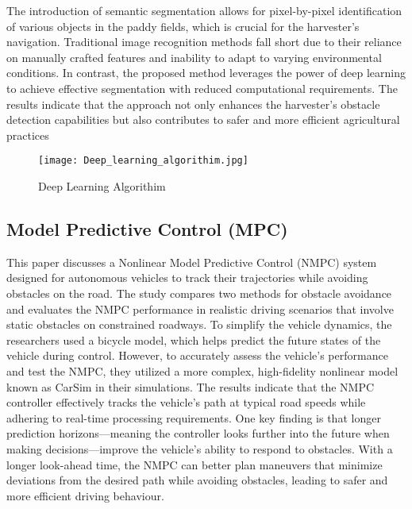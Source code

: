 \documentclass[12pt,twocolumn]{article}
\begin{document}
The introduction of semantic segmentation allows for pixel-by-pixel identification of various objects in the paddy fields, which is crucial for the harvester's navigation. Traditional image recognition methods fall short due to their reliance on manually crafted features and inability to adapt to varying environmental conditions. In contrast, the proposed method leverages the power of deep learning to achieve effective segmentation with reduced computational requirements. The results indicate that the approach not only enhances the harvester's obstacle detection capabilities but also contributes to safer and more efficient agricultural practices

\begin{figure}[h]
\centering
\texttt{[image: Deep\_learning\_algorithim.jpg]}
\caption{Deep Learning Algorithim}
\label{fig_ICNet}
\end{figure}
\subsection{Model Predictive Control (MPC)}

This paper discusses a Nonlinear Model Predictive Control (NMPC) system designed for autonomous vehicles to track their trajectories while avoiding obstacles on the road. The study compares two methods for obstacle avoidance and evaluates the NMPC performance in realistic driving scenarios that involve static obstacles on constrained roadways. To simplify the vehicle dynamics, the researchers used a bicycle model, which helps predict the future states of the vehicle during control. However, to accurately assess the vehicle's performance and test the NMPC, they utilized a more complex, high-fidelity nonlinear model known as CarSim in their simulations.
The results indicate that the NMPC controller effectively tracks the vehicle's path at typical road speeds while adhering to real-time processing requirements. One key finding is that longer prediction horizons—meaning the controller looks further into the future when making decisions—improve the vehicle's ability to respond to obstacles. With a longer look-ahead time, the NMPC can better plan maneuvers that minimize deviations from the desired path while avoiding obstacles, leading to safer and more efficient driving behaviour.
\end{document}
